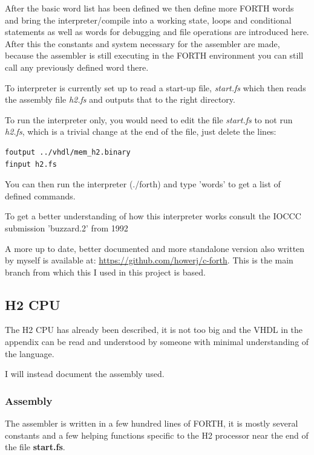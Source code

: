 \documentclass	[a4paper, 10pt]	{article}
\begin{document}
      After the basic word list has been defined we then define more FORTH words and
      bring the interpreter/compile into a working state, loops and conditional
      statements as well as words for debugging and file operations are introduced
      here. After this the constants and system necessary for the assembler are made,
      because the assembler is still executing in the FORTH environment you can still
      call any previously defined word there.

      To interpreter is currently set up to read a start-up file, \emph{start.fs}
      which then reads the assembly file \emph{h2.fs} and outputs that to the right
      directory.

      To run the interpreter only, you would need to edit the file \emph{start.fs}
      to not run \emph{h2.fs}, which is a trivial change at the end of the file,
      just delete the lines:

      \begin{verbatim}
foutput ../vhdl/mem_h2.binary
finput h2.fs
      \end{verbatim}     
       
      You can then run the interpreter (./forth) and type 'words' to get a list of
      defined commands.

      To get a better understanding of how this interpreter works consult the
      IOCCC submission 'buzzard.2' from 1992 \cite{ioccc}

      A more up to date, better documented and more standalone version also
      written by myself is available at: \url{https://github.com/howerj/c-forth}.
      This is the main branch from which this I used in this project is
      based.

    \subsection{H2 CPU}

    The H2 CPU has already been described, it is not too big and the VHDL in the
    appendix can be read and understood by someone with minimal understanding of
    the language.

    I will instead document the assembly used.

      \subsubsection{Assembly}

    The assembler is written in a few hundred lines of FORTH, it is mostly
    several constants and a few helping functions specific to the H2 processor
    near the end of the file \textbf{start.fs}.
\end{document}
